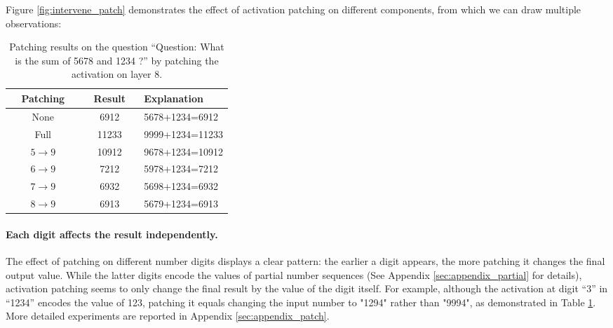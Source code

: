 \documentclass[11pt]{article}
\begin{document}
Figure \ref{fig:intervene_patch} demonstrates the effect of activation patching on different components, from which we can draw multiple observations:

\begin{table}[htbp]
    \centering
    \begin{tabular}{c|c|p{0.4\linewidth}}
    \hline
    Patching & Result & Explanation \\
    \hline
    None & 6912 & 5678+1234=6912 \\
    Full & 11233 & 9999+1234=11233 \\
    $5 \xrightarrow{} 9$ & 10912 & 9678+1234=10912 \\
    $6 \xrightarrow{} 9$ & 7212 & 5978+1234=7212 \\
    $7 \xrightarrow{} 9$ & 6932 & 5698+1234=6932 \\
    $8 \xrightarrow{} 9$ & 6913 & 5679+1234=6913 \\
    \hline
    \end{tabular}
    \caption{Patching results on the question ``Question: What is the sum of 5678 and 1234 ?'' by patching the activation on layer 8.}
    \label{tab:patch_example}
\end{table}

\paragraph{Each digit affects the result independently.}
The effect of patching on different number digits displays a clear pattern: the earlier a digit appears, the more patching it changes the final output value.
While the latter digits encode the values of partial number sequences (See Appendix \ref{sec:appendix_partial} for details), activation patching seems to only change the final result by the value of the digit itself.
For example, although the activation at digit ``3'' in ``1234'' encodes the value of 123, patching it equals changing the input number to "1294" rather than "9994", as demonstrated in Table \ref{tab:patch_example}.
More detailed experiments are reported in Appendix \ref{sec:appendix_patch}. 
\end{document}
